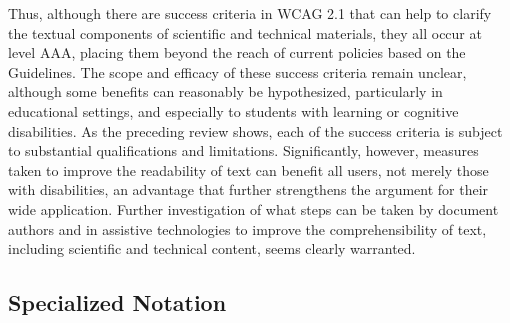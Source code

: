 \documentclass{sig-alternate} %
\begin{document}
\begin{large}
Thus, although there are success criteria in WCAG 2.1 that can help to clarify the textual components of scientific and technical materials, they all occur at level AAA, placing them beyond the reach of current policies based on the Guidelines. The scope and efficacy of these success criteria remain unclear, although some benefits can reasonably be hypothesized, particularly in educational settings, and especially to students with learning or cognitive disabilities. As the preceding review shows, each of the success criteria is subject to substantial qualifications and limitations. Significantly, however, measures taken to improve the readability of text can benefit all users, not merely those with disabilities, an advantage that further strengthens the argument for their wide application. Further investigation of what steps can be taken by document authors and in assistive technologies to improve the comprehensibility of text, including scientific and technical content, seems clearly warranted.

\subsection*{Specialized Notation}


\end{large}
\end{document}
